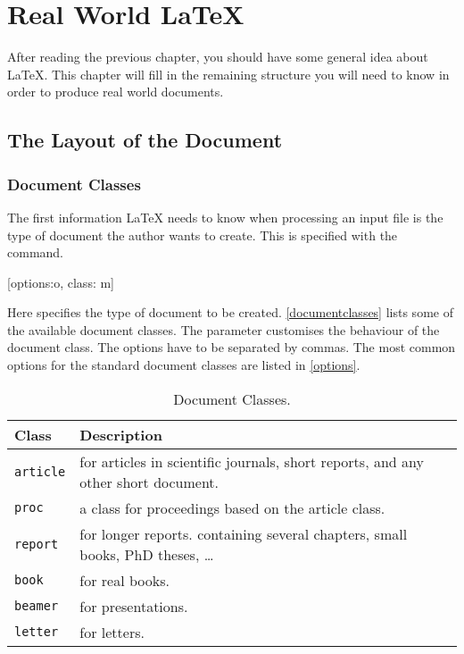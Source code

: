 \chapter{Real World \LaTeX{}}\label{chap:realworld}

\begin{intro}
  After reading the previous chapter, you should have some general idea
  about \LaTeX{}. This chapter
  will fill in the remaining structure you will need to know in order
  to produce real world documents.
\end{intro}

\section{The Layout of the Document}

\subsection{Document Classes}\label{sec:documentclass}

The first information \LaTeX{} needs to know when processing an
input file is the type of document the author wants to create. This
is specified with the  command.
\begin{lscommand}
  [options:o, class: m]
\end{lscommand}
Here  specifies the type of document to be created.
\autoref{documentclasses} lists some of the available document classes. The
 parameter customises the behaviour of the document class.
The options have to be separated by commas. The most common options for the
standard document classes are listed in \autoref{options}.

\begin{table}
  \caption{Document Classes.}\label{documentclasses}
  \begin{tabular}{@{}lp{8cm}@{}}
    \toprule
    Class                                 & Description               \\
    \midrule
    \texttt{article}\index{article class} & for articles in
    scientific journals, short reports, and any other short document. \\
    \texttt{proc}\index{proc class}       & a class for
    proceedings based on the article class.                           \\
    \texttt{report}\index{report class}   & for longer reports.
    containing several chapters, small books, PhD theses, \ldots      \\
    \texttt{book}\index{book class}       & for real books.           \\
    \texttt{beamer}\index{beamer class}   & for presentations.        \\
    \texttt{letter}\index{letter class}   & for letters.              \\
    \bottomrule
  \end{tabular}
\end{table}


